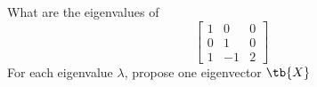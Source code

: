 \bexo
What are the eigenvalues of 
\begin{equation}
\begin{bmatrix}
1 & 0 & 0\\
0 & 1 & 0\\
1 & -1 & 2
\end{bmatrix}
\end{equation}
For each eigenvalue $\lambda$, propose one eigenvector $\tb{X}$
\eexo
{}






